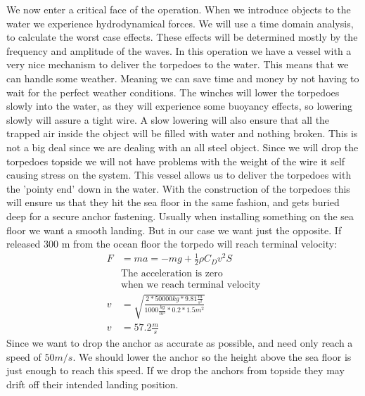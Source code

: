 \documentclass[DIV=calc, paper=a4, fontsize=13pt, twocolumn]{scrartcl}	 %
\begin{document}
We now enter a critical face of the operation. When we introduce objects to the water we experience hydrodynamical forces. We will use a time domain analysis, to calculate the worst case effects. These effects will be determined mostly by the frequency and amplitude of the waves. In this operation we have a vessel with a very nice mechanism to deliver the torpedoes to the water. This means that we can handle some weather. Meaning we can save time and money by not having to wait for the perfect weather conditions.
The winches will lower the torpedoes slowly into the water, as they will experience some buoyancy effects, so lowering slowly will assure a tight wire. A slow lowering will also ensure that all the trapped air inside the object will be filled with water and nothing broken. This is not a big deal since we are dealing with an all steel object. Since we will drop the torpedoes topside we will not have problems with the weight of the wire it self causing stress on the system. 
This vessel allows us to deliver the torpedoes with the 'pointy end' down in the water. With the construction of the torpedoes this will ensure us that they hit the sea floor in the same fashion, and gets buried deep for a secure anchor fastening.
\newline 
Usually when installing something on the sea floor we want a smooth landing. But in our case we want just the opposite. 
If released 300 m from the ocean floor the torpedo will reach terminal velocity:
\begin{align*}
F &= ma = -mg + \frac{1}{2} \rho C_D v^2 S \\
&\text{The acceleration is zero} \\
&\text{when we reach terminal velocity} \\
v &= \sqrt{\frac{2 * 50 000 kg * 9.81 \frac{m}{s^2}}{1000\frac{kg}{m^3} * 0.2 * 1.5 m^2}} \\
v &= 57.2 \frac{m}{s}
\end{align*}
Since we want to drop the anchor as accurate as possible, and need only reach a speed of $50 m/s$. We should lower the anchor so the height above the sea floor is just enough to reach this speed. If we drop the anchors from topside they may drift off their intended landing position. 
\newline
\end{document}
